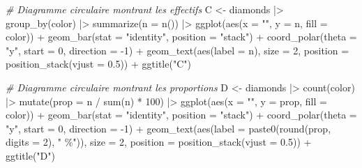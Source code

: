 \documentclass[
]{book}
\newenvironment{Shaded}{\begin{snugshade}}{\end{snugshade}}
\newcommand{\AttributeTok}[1]{\textcolor[rgb]{0.77,0.63,0.00}{#1}}
\newcommand{\CommentTok}[1]{\textcolor[rgb]{0.56,0.35,0.01}{\textit{#1}}}
\newcommand{\DecValTok}[1]{\textcolor[rgb]{0.00,0.00,0.81}{#1}}
\newcommand{\FloatTok}[1]{\textcolor[rgb]{0.00,0.00,0.81}{#1}}
\newcommand{\FunctionTok}[1]{\textcolor[rgb]{0.00,0.00,0.00}{#1}}
\newcommand{\NormalTok}[1]{#1}
\newcommand{\OtherTok}[1]{\textcolor[rgb]{0.56,0.35,0.01}{#1}}
\newcommand{\SpecialCharTok}[1]{\textcolor[rgb]{0.00,0.00,0.00}{#1}}
\newcommand{\StringTok}[1]{\textcolor[rgb]{0.31,0.60,0.02}{#1}}
\begin{document}
\begin{Shaded}
\begin{Highlighting}[]
\CommentTok{\# Diagramme circulaire montrant les effectifs}
\NormalTok{C }\OtherTok{\textless{}{-}}
\NormalTok{  diamonds }\SpecialCharTok{|\textgreater{}}
  \FunctionTok{group\_by}\NormalTok{(color) }\SpecialCharTok{|\textgreater{}}
  \FunctionTok{summarize}\NormalTok{(}\AttributeTok{n =} \FunctionTok{n}\NormalTok{()) }\SpecialCharTok{|\textgreater{}}
  \FunctionTok{ggplot}\NormalTok{(}\FunctionTok{aes}\NormalTok{(}\AttributeTok{x =} \StringTok{""}\NormalTok{, }\AttributeTok{y =}\NormalTok{ n, }\AttributeTok{fill =}\NormalTok{ color)) }\SpecialCharTok{+}
  \FunctionTok{geom\_bar}\NormalTok{(}\AttributeTok{stat =} \StringTok{"identity"}\NormalTok{, }\AttributeTok{position =} \StringTok{"stack"}\NormalTok{) }\SpecialCharTok{+}
  \FunctionTok{coord\_polar}\NormalTok{(}\AttributeTok{theta =} \StringTok{"y"}\NormalTok{,}
              \AttributeTok{start =} \DecValTok{0}\NormalTok{,}
              \AttributeTok{direction =} \SpecialCharTok{{-}}\DecValTok{1}\NormalTok{) }\SpecialCharTok{+}
  \FunctionTok{geom\_text}\NormalTok{(}\FunctionTok{aes}\NormalTok{(}\AttributeTok{label =}\NormalTok{ n),}
            \AttributeTok{size =} \DecValTok{2}\NormalTok{,}
            \AttributeTok{position =} \FunctionTok{position\_stack}\NormalTok{(}\AttributeTok{vjust =} \FloatTok{0.5}\NormalTok{)) }\SpecialCharTok{+}
  \FunctionTok{ggtitle}\NormalTok{(}\StringTok{"C"}\NormalTok{)}

\CommentTok{\# Diagramme circulaire montrant les proportions}
\NormalTok{D }\OtherTok{\textless{}{-}}
\NormalTok{  diamonds }\SpecialCharTok{|\textgreater{}}
  \FunctionTok{count}\NormalTok{(color) }\SpecialCharTok{|\textgreater{}}
  \FunctionTok{mutate}\NormalTok{(}\AttributeTok{prop =}\NormalTok{ n }\SpecialCharTok{/} \FunctionTok{sum}\NormalTok{(n) }\SpecialCharTok{*} \DecValTok{100}\NormalTok{) }\SpecialCharTok{|\textgreater{}}
  \FunctionTok{ggplot}\NormalTok{(}\FunctionTok{aes}\NormalTok{(}\AttributeTok{x =} \StringTok{""}\NormalTok{, }\AttributeTok{y =}\NormalTok{ prop, }\AttributeTok{fill =}\NormalTok{ color)) }\SpecialCharTok{+}
  \FunctionTok{geom\_bar}\NormalTok{(}\AttributeTok{stat =} \StringTok{"identity"}\NormalTok{, }\AttributeTok{position =} \StringTok{"stack"}\NormalTok{) }\SpecialCharTok{+}
  \FunctionTok{coord\_polar}\NormalTok{(}\AttributeTok{theta =} \StringTok{"y"}\NormalTok{,}
              \AttributeTok{start =} \DecValTok{0}\NormalTok{,}
              \AttributeTok{direction =} \SpecialCharTok{{-}}\DecValTok{1}\NormalTok{) }\SpecialCharTok{+}
  \FunctionTok{geom\_text}\NormalTok{(}\FunctionTok{aes}\NormalTok{(}\AttributeTok{label =} \FunctionTok{paste0}\NormalTok{(}\FunctionTok{round}\NormalTok{(prop, }\AttributeTok{digits =} \DecValTok{2}\NormalTok{), }\StringTok{" \%"}\NormalTok{)),}
            \AttributeTok{size =} \DecValTok{2}\NormalTok{,}
            \AttributeTok{position =} \FunctionTok{position\_stack}\NormalTok{(}\AttributeTok{vjust =} \FloatTok{0.5}\NormalTok{)) }\SpecialCharTok{+}
  \FunctionTok{ggtitle}\NormalTok{(}\StringTok{"D"}\NormalTok{)}
\end{Highlighting}
\end{Shaded}
\end{document}
